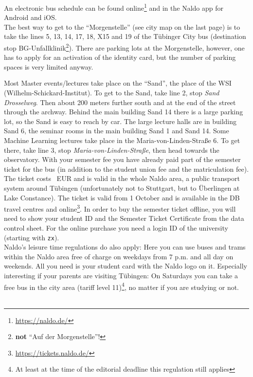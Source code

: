 \ifml

An electronic bus schedule can be found online\footnote{\url{https://naldo.de/}} and in the Naldo app for Android and iOS.\\
The best way to get to the "`Morgenstelle"' (see city map on the last page) is to take the lines 5, 13, 14, 17, 18, X15 and 19 of the Tübinger City bus (destination stop BG-Unfallklinik\footnote{\textbf{not} "`Auf der Morgenstelle"'!}). There are parking lots at the Morgenstelle, however, one has to apply for an activation of the identity card, but the number of parking spaces is very limited anyway.

\ifmaster
Most Master events/lectures take place on the "`Sand"', the place of the WSI (Wilhelm-Schickard-Institut). To get to the Sand, take line 2, stop \emph{Sand Drosselweg}. Then about 200 meters further south and at the end of the street through the archway. Behind the main building Sand 14 there is a large parking lot, so the Sand is easy to reach by car. The large lecture halls are in building Sand 6, the seminar rooms in the main building Sand 1 and Sand 14. Some Machine Learning lectures take place in the
Maria-von-Linden-Straße 6. To get there, take line 3, stop \emph{Maria-von-Linden-Straße}, then head towards the observatory.
\fi
With your semester fee you have already paid part of the semester ticket for the bus (in addition to the student union fee and the matriculation fee).
The ticket costs \ticketpreis~EUR and is valid in the whole Naldo area, a public transport system around
Tübingen (unfortunately not to Stuttgart, but to Überlingen at Lake Constance). The ticket is valid from 1 October and is available in the DB travel centres and online\footnote{\url{https://tickets.naldo.de/}}. In order to buy the semester ticket offline, you will need to show your student ID and the Semester Ticket Certificate from the data control sheet. For the online purchase you need a login ID of the university (starting with \texttt{zx}).\\
Naldo's leisure time regulations do also apply: Here you can use buses and trams within the Naldo area free of charge on weekdays from 7 p.m. and all day on weekends. All you need is your student card with the Naldo logo on it.
Especially interesting if your parents are visiting Tübingen: On Saturdays you can take a free bus in the city area (tariff level 11)\footnote{At least at the time of the editorial deadline this regulation still applies}, no matter if you are studying or not.\\ \\

